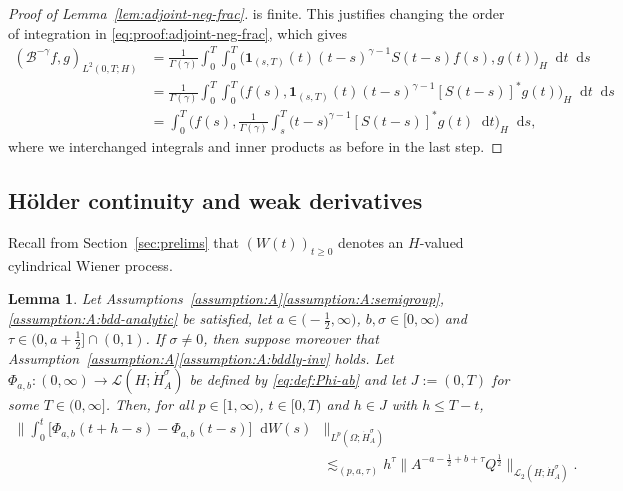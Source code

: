 \documentclass[reqno]{amsart}
\numberwithin{equation}{section}
\newcommand{\cB}{\mathcal{B}}
\newcommand{\rd}{\mathop{}\!\mathrm{d}}
\newcommand{\from}{\colon}
\newcommand{\dual}[1]{#1^*}
\newcommand{\Hdot}[1]{\dot{H}^{#1}_A}
\newtheorem{lemma}{Lemma}[section]
\theoremstyle{remark}
\theoremstyle{definition}
\begin{document}
\begin{proof}[Proof of Lemma~\ref{lem:adjoint-neg-frac}]
	is finite.  
	This justifies changing the order of integration 
	in \eqref{eq:proof:adjoint-neg-frac}, which gives 
	\begin{align*}
	(\cB^{-\gamma}f, g)_{L^2(0,T;H)} 
	&= 
	\frac{1}{\Gamma(\gamma)} 
	\int_0^T \int_0^T 
	\bigl( \mathbf 1_{(s,T)}(t) (t-s)^{\gamma-1} S(t-s) f(s), g(t) \bigr)_H 
	\rd t \rd s 
	\\
	&= 
	\frac{1}{\Gamma(\gamma)} 
	\int_0^T \int_0^T 
	\bigl( f(s), \mathbf 1_{(s,T)}(t) (t-s)^{\gamma-1} \dual{[S(t-s)]} g(t) \bigr)_H 
	\rd t \rd s 
	\\
	&= 
	\int_0^T 
	\biggl( f(s), \frac{1}{\Gamma(\gamma)} 
	\int_s^T \mathbf (t-s)^{\gamma-1} \dual{[S(t-s)]} g(t) \rd t 
	\biggr)_H \rd s, 
	\end{align*}
	where we interchanged integrals and inner products 
	as before in the last step.  
\end{proof} 

\subsection{H\"{o}lder continuity and weak derivatives}
\label{app:subsec:orbital} 

Recall from Section~\ref{sec:prelims} 
that $(W(t))_{t\geq 0}$ denotes 
an $H$-valued cylindrical Wiener process. 

\begin{lemma}\label{lemma:I-1}
	Let 
	Assumptions~\textup{\ref{assumption:A}\ref{assumption:A:semigroup},\ref{assumption:A:bdd-analytic}} 
	be satisfied, 
	let $a \in \bigl(-\frac{1}{2},\infty\bigr)$, ${b, \sigma \in [0,\infty)}$ 
	and $\tau\in\bigl( 0,a + \frac{1}{2} \bigr] \cap (0,1)$.  
	If $\sigma \neq 0$, then suppose moreover that
	Assumption~\textup{\ref{assumption:A}\ref{assumption:A:bddly-inv}} holds. 
	Let 
	$\Phi_{a,b}\from(0,\infty)\to\mathscr L(H; \Hdot{\sigma})$ 
	be defined by \eqref{eq:def:Phi-ab} 
	and let $J:=(0,T)$ 
	for some ${T \in (0,\infty]}$. 
	Then, 
	for all $p \in [1,\infty)$, 
	$t \in [0,T)$ and $h \in J$ 
	with $h\leq T-t$, 
	\begin{align*}  
	\biggl\| 
	\int_0^t \bigl[ \Phi_{a,b}(t+h-s) - \Phi_{a,b}(t-s) \bigr] \rd W(s) 
	&\biggr\|_{L^p(\Omega;\dot H_A^\sigma)} 
	\\
	&\lesssim_{(p,a,\tau)} 
	h^\tau 
	\bigl\| A^{-a-\frac{1}{2} +b +\tau} 
	Q^{\frac{1}{2}} \bigr\|_{\mathscr L_2(H;\Hdot \sigma)}. 
	\end{align*}
\end{lemma}
\end{document}
